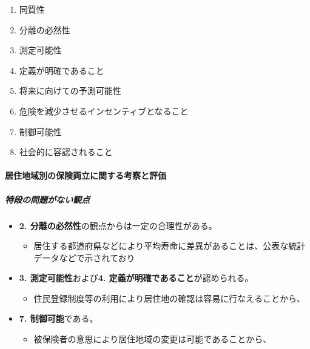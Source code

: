\documentclass[]{article}
\begin{document}
\begin{enumerate}
\def\labelenumi{\arabic{enumi}.}
\tightlist
\item
  同質性
\item
  分離の必然性
\item
  測定可能性
\item
  定義が明確であること
\item
  将来に向けての予測可能性
\item
  危険を減少させるインセンティブとなること
\item
  制御可能性
\item
  社会的に容認されること
\end{enumerate}

\hypertarget{ux5c45ux4f4fux5730ux57dfux5225ux306eux4fddux967aux4e21ux7acbux306bux95a2ux3059ux308bux8003ux5bdfux3068ux8a55ux4fa1}{%
\paragraph{居住地域別の保険両立に関する考察と評価}\label{ux5c45ux4f4fux5730ux57dfux5225ux306eux4fddux967aux4e21ux7acbux306bux95a2ux3059ux308bux8003ux5bdfux3068ux8a55ux4fa1}}

\hypertarget{ux7279ux6bb5ux306eux554fux984cux304cux306aux3044ux89b3ux70b9}{%
\subparagraph{特段の問題がない観点}\label{ux7279ux6bb5ux306eux554fux984cux304cux306aux3044ux89b3ux70b9}}

\begin{itemize}
\tightlist
\item
  \textbf{2. 分離の必然性}の観点からは一定の合理性がある。

  \begin{itemize}
  \tightlist
  \item
    居住する都道府県などにより平均寿命に差異があることは、公表な統計データなどで示されており
  \end{itemize}
\item
  \textbf{3. 測定可能性}および\textbf{4.
  定義が明確であること}が認められる。

  \begin{itemize}
  \tightlist
  \item
    住民登録制度等の利用により居住地の確認は容易に行なえることから、
  \end{itemize}
\item
  \textbf{7. 制御可能}である。

  \begin{itemize}
  \tightlist
  \item
    被保険者の意思により居住地域の変更は可能であることから、
  \end{itemize}
\end{itemize}
\end{document}
